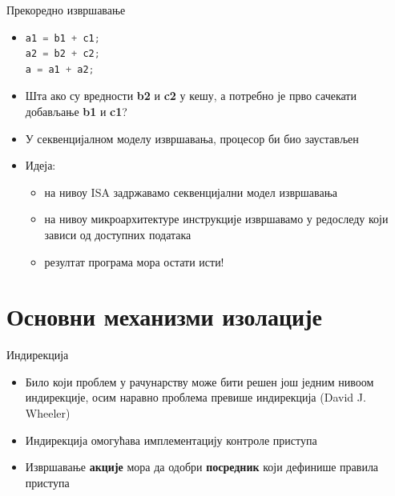 \documentclass{beamer}
\begin{document}
    \begin{frame}[fragile]{Прекоредно извршавање}
        \begin{itemize}
            \item{
                \begin{lstlisting}[language=java]
a1 = b1 + c1;
a2 = b2 + c2;
a = a1 + a2;
                \end{lstlisting}
            }
            
            \item Шта ако су вредности \textbf{b2} и \textbf{c2} у кешу, а потребно је прво сачекати добављање \textbf{b1} и \textbf{c1}?
            \item У секвенцијалном моделу извршавања, процесор би био заустављен
            \item Идеја:
            \begin{itemize}
                \item на нивоу ISA задржавамо секвенцијални модел извршавања
                \item на нивоу микроархитектуре инструкције извршавамо у редоследу који зависи од доступних података
                \item резултат програма мора остати исти!
            \end{itemize}
        \end{itemize}
    \end{frame}
    
    \section{Основни механизми изолације}
    
    \begin{frame}{Индирекција}
        \begin{itemize}
            \item Било који проблем у рачунарству може бити решен још једним нивоом индирекције, осим наравно проблема превише индирекција (David J. Wheeler)
            \item Индирекција омогућава имплементацију контроле приступа
            \item Извршавање \textbf{акције} мора да одобри \textbf{посредник} који дефинише правила приступа
        \end{itemize}
    \end{frame}
    
\end{document}
